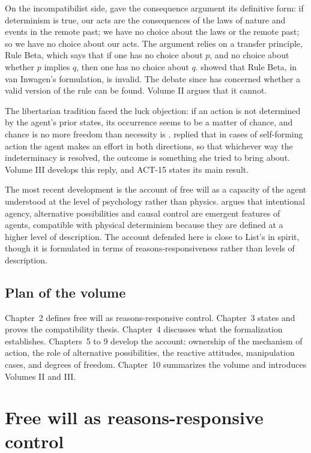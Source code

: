 \documentclass{situationist-preprint}
\begin{document}
On the incompatibilist side, \citet{vanInwagen1983} gave the consequence argument its definitive form: if determinism is true, our acts are the consequences of the laws of nature and events in the remote past; we have no choice about the laws or the remote past; so we have no choice about our acts. The argument relies on a transfer principle, Rule Beta, which says that if one has no choice about $p$, and no choice about whether $p$ implies $q$, then one has no choice about $q$. \citet{McKayJohnson1996} showed that Rule Beta, in van Inwagen's formulation, is invalid. The debate since has concerned whether a valid version of the rule can be found. Volume II argues that it cannot.

The libertarian tradition faced the luck objection: if an action is not determined by the agent's prior states, its occurrence seems to be a matter of chance, and chance is no more freedom than necessity is \citep{Mele2006}. \citet{Kane1996} replied that in cases of self-forming action the agent makes an effort in both directions, so that whichever way the indeterminacy is resolved, the outcome is something she tried to bring about. Volume III develops this reply, and ACT-15 states its main result.

The most recent development is the account of free will as a capacity of the agent understood at the level of psychology rather than physics. \citet{List2019} argues that intentional agency, alternative possibilities and causal control are emergent features of agents, compatible with physical determinism because they are defined at a higher level of description. The account defended here is close to List's in spirit, though it is formulated in terms of reasons-responsiveness rather than levels of description.

\subsection{Plan of the volume}

Chapter~2 defines free will as reasons-responsive control. Chapter~3 states and proves the compatibility thesis. Chapter~4 discusses what the formalization establishes. Chapters~5 to 9 develop the account: ownership of the mechanism of action, the role of alternative possibilities, the reactive attitudes, manipulation cases, and degrees of freedom. Chapter~10 summarizes the volume and introduces Volumes II and III.

\section{Free will as reasons-responsive control}
\end{document}
